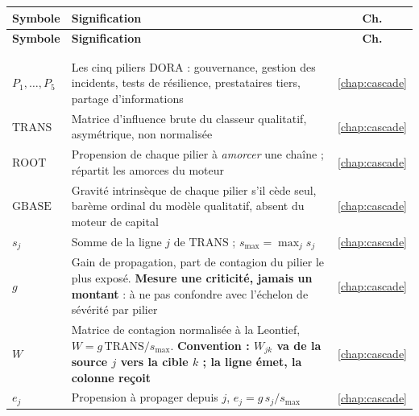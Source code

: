 \renewcommand{\arraystretch}{1.22}
{\small
\begin{longtable}{>{\raggedright}p{3.3cm} >{\raggedright\arraybackslash}p{10.2cm} c}
\toprule
\rowcolor{lightblue}
\textbf{Symbole} & \textbf{Signification} & \textbf{Ch.} \\
\midrule
\endfirsthead
\toprule
\rowcolor{lightblue}
\textbf{Symbole} & \textbf{Signification} & \textbf{Ch.} \\
\midrule
\endhead
\bottomrule
\multicolumn{3}{r@{}}{\footnotesize\itshape suite page suivante} \\
\endfoot
\bottomrule
\endlastfoot
\multicolumn{3}{@{}l}{\emph{\textcolor{navy}{Piliers et cascade dirigée}}} \\
$P_1,\dots,P_5$ & Les cinq piliers DORA : gouvernance, gestion des incidents, tests de résilience, prestataires tiers, partage d'informations & \ref{chap:cascade} \\
$\mathrm{TRANS}$ & Matrice d'influence brute du classeur qualitatif, asymétrique, non normalisée & \ref{chap:cascade} \\
$\mathrm{ROOT}$ & Propension de chaque pilier à \emph{amorcer} une chaîne ; répartit les amorces du moteur & \ref{chap:cascade} \\
$\mathrm{GBASE}$ & Gravité intrinsèque de chaque pilier s'il cède seul, barème ordinal du modèle qualitatif, absent du moteur de capital & \ref{chap:cascade} \\
$s_j$ & Somme de la ligne $j$ de $\mathrm{TRANS}$ ; $s_{\max}=\max_j s_j$ & \ref{chap:cascade} \\
$g$ & Gain de propagation, part de contagion du pilier le plus exposé. \textbf{Mesure une criticité, jamais un montant} : à ne pas confondre avec l'échelon de sévérité par pilier & \ref{chap:cascade} \\
$W$ & Matrice de contagion normalisée à la Leontief, $W=g\,\mathrm{TRANS}/s_{\max}$. \textbf{Convention : $W_{jk}$ va de la source $j$ vers la cible $k$ ; la ligne émet, la colonne reçoit} & \ref{chap:cascade} \\
$e_j$ & Propension à propager depuis $j$, $e_j=g\,s_j/s_{\max}$ & \ref{chap:cascade} \\

\end{longtable}}
